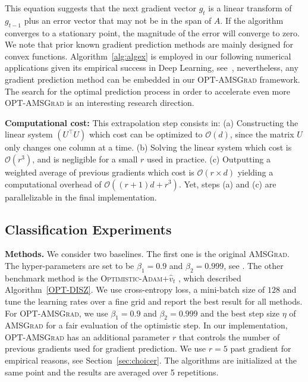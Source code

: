 \documentclass[twoside]{article}
\begin{document}
This equation suggests that the next gradient vector $g_{t}$ is a linear transform of $g_{{t-1}}$ plus an error vector that may not be in the span of $A$.
If the algorithm converges to a stationary point, the magnitude of the error will converge to zero. 
We note that prior known gradient prediction methods are mainly designed for convex functions.
Algorithm~\ref{alg:algex} is employed in our following numerical applications given its empirical success in Deep Learning, see~\cite{Scieur18}, nevertheless, any gradient prediction method can be embedded in our \textsc{OPT-AMSGrad} framework.
The search for the optimal prediction process in order to accelerate even more \textsc{OPT-AMSGrad} is an interesting research direction.

\textbf{Computational cost:}
 This extrapolation step consists in: \textsf{(a)} Constructing the linear system $(U^\top U)$ which cost can be optimized to $\mathcal{O}(d)$, since the matrix $U$ only changes one column at a time. \textsf{(b)} Solving the linear system which cost is $\mathcal{O}(r^3)$, and is negligible for a small $r$ used in practice.\textsf{ (c)} Outputting a weighted average of previous gradients which cost is $\mathcal{O}(r \times d)$ yielding a computational overhead of $\mathcal O\left((r+1)d+r^3\right)$.
Yet, steps \textsf{(a)} and \textsf{(c)} are parallelizable in the final implementation.


\subsection{Classification Experiments}
\vspace{-0.05in}


\textbf{Methods.}
We consider two baselines. The first one is the original \textsc{AMSGrad}. 
The hyper-parameters are set to be $\beta_1 = 0.9$ and $\beta_2 = 0.999$, see \citep{RKK18}. 
The other benchmark method is the \textsc{Optimistic-Adam$+\hat{v}_t$} \citep{DISZ18}, which described Algorithm~\ref{OPT-DISZ}. 
We use cross-entropy loss, a mini-batch size of $128$ and tune the learning rates over a fine grid and report the best result for all methods.
For \textsc{OPT-AMSGrad}, we use $\beta_1 = 0.9$ and $\beta_2 = 0.999$ and the best step size $\eta$ of \textsc{AMSGrad} for a fair evaluation of the optimistic step. In our implementation, \textsc{OPT-AMSGrad} has an additional parameter $r$ that controls the number of previous gradients used for gradient prediction. 
We use $r=5$ past gradient for empirical reasons, see Section~\ref{sec:choicer}.
The algorithms are initialized at the same point and the results are averaged over 5 repetitions.
\end{document}
